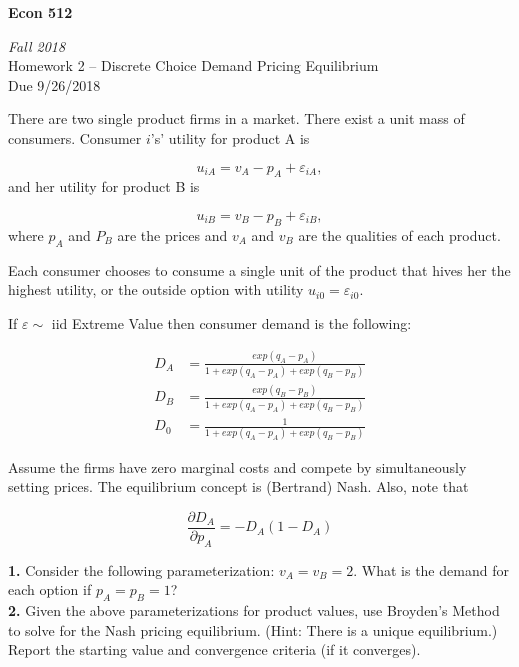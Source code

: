 \documentclass[10pt]{article}
\begin{document}
\begin{center}
\textbf{Econ 512}

\emph{Fall 2018}\\[1em]

Homework 2 -- Discrete Choice Demand Pricing Equilibrium \\
Due 9/26/2018
\\[3em]
\end{center}

There are two single product firms in a market. There exist a unit mass of consumers. Consumer $i$'s'  utility for product A is

$$u_{iA} = v_A - p_A + \varepsilon_{iA},$$
and her utility for product B is

$$u_{iB} = v_B - p_B + \varepsilon_{iB},$$
where $p_A$ and $P_B$ are the prices and $v_A$ and $v_B$ are the qualities of each product.  

Each consumer chooses to consume a single unit of the product that hives her the highest utility, or the outside option with utility $u_{i0} = \varepsilon_{i0}$.

If $\varepsilon\sim$ iid Extreme Value then consumer demand is the following:

\begin{align*}
D_A &= \frac{exp(q_A - p_A)}{1 + exp(q_A - p_A) + exp(q_B - p_B)} \\
D_B &= \frac{exp(q_B - p_B)}{1 + exp(q_A - p_A) + exp(q_B - p_B)} \\
D_0 &= \frac{1}{1 + exp(q_A - p_A) + exp(q_B - p_B)} 
\end{align*} 

Assume the firms have zero marginal costs and compete by simultaneously setting prices. The equilibrium concept is (Bertrand) Nash. Also, note that 

$$\frac{\partial D_A}{\partial p_A} = -D_A(1-D_A)$$

\vspace{2em}

\noindent
\textbf{1.} Consider the following parameterization: $v_A=v_B=2$. What is the demand for each option if $p_A=p_B=1$?\\[2em]

\noindent
\textbf{2.}
Given the above parameterizations for product values, use Broyden's Method to solve for the Nash pricing equilibrium. (Hint: There is a unique equilibrium.) Report the starting value and convergence criteria (if it converges).\\[2em]
\end{document}

